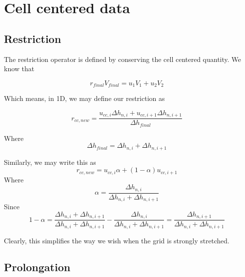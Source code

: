 \documentclass[11pt]{article}
\begin{document}
\section{Cell centered data}

\subsection{Restriction}
The restriction operator is defined by conserving the cell centered quantity. We know that

\begin{equation}
	r_{final} V_{final} = u_1 V_1 + u_2 V_2
\end{equation}

Which means, in 1D, we may define our restriction as

\begin{equation}
	r_{cc,new} = \frac{u_{cc,i} \Delta h_{n,i} +u_{cc,i+1} \Delta h_{n,i+1} }{\Delta h_{final}}
\end{equation}

Where
\begin{equation}
	\Delta h_{final} = \Delta h_{n,i} + \Delta h_{n,i+1}
\end{equation}

Similarly, we may write this as 
\begin{equation}
	r_{cc,new} = u_{cc,i} \alpha + (1-\alpha)u_{cc,i+1}
\end{equation}
Where
\begin{equation}
	\alpha = \frac{\Delta h_{n,i}}{\Delta h_{n,i}+\Delta h_{n,i+1}}
\end{equation}
Since
\begin{equation}
	1 - \alpha 
	= 
	\frac{\Delta h_{n,i}+\Delta h_{n,i+1}}{\Delta h_{n,i}+\Delta h_{n,i+1}}
	-
	\frac{\Delta h_{n,i}}{\Delta h_{n,i}+\Delta h_{n,i+1}}
	=
	\frac{\Delta h_{n,i+1}}{\Delta h_{n,i}+\Delta h_{n,i+1}}
\end{equation}

Clearly, this simplifies the way we wish when the grid is strongly stretched.

\subsection{Prolongation}
\end{document}
